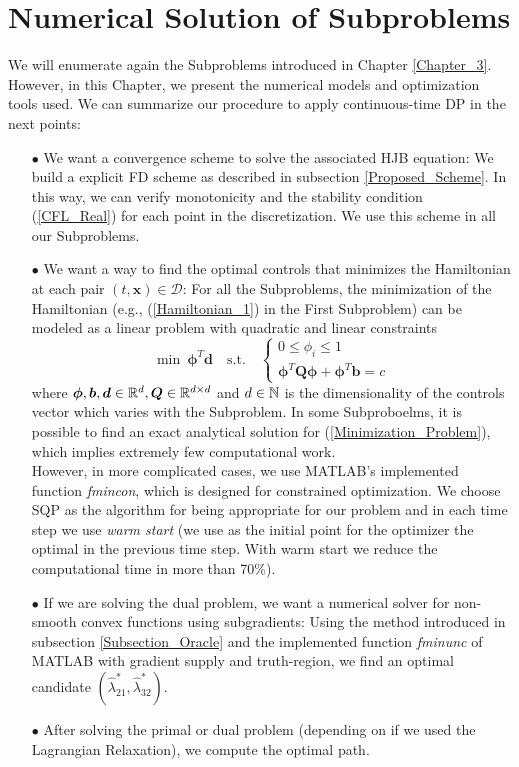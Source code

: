 \section{Numerical Solution of Subproblems}

We will enumerate again the Subproblems introduced in Chapter \ref{Chapter_3}. However, in this Chapter, we present the numerical models and optimization tools used. We can summarize our procedure to apply continuous-time DP in the next points:

\begin{enumerate}

\item[$\bullet$] We want a convergence scheme to solve the associated HJB equation: We build a explicit FD scheme as described in subsection \ref{Proposed_Scheme}. In this way, we can verify monotonicity and the stability condition (\ref{CFL_Real}) for each point in the discretization. We use this scheme in all our Subproblems.

\item[$\bullet$] We want a way to find the optimal controls that minimizes the Hamiltonian at each pair $(t,\bm{x})\in\mathcal{D}$: For all the Subproblems, the minimization of the Hamiltonian (e.g., (\ref{Hamiltonian_1}) in the First Subproblem) can be modeled as a linear problem with quadratic and linear constraints
\begin{equation}
\min\ \bm{\phi}^T\bm{d}\quad\text{s.t.}\quad\begin{cases}
0\leq\phi_i\leq1\\
\bm{\phi}^T\bm{Q}\bm{\phi}+\bm{\phi}^T\bm{b}=c
\end{cases}
\label{Minimization_Problem}
\end{equation}
where $\bm{\phi},\bm{b},\bm{d}\in\mathbb{R}^d,\bm{Q}\in\mathbb{R}^{d\times d}$ and $d\in\mathbb{N}$ is the dimensionality of the controls vector which varies with the Subproblem. In some Subproboelms, it is possible to find an exact analytical solution for (\ref{Minimization_Problem}), which implies extremely few computational work.\\
However, in more complicated cases, we use MATLAB's implemented function \textit{fmincon}, which is designed for constrained optimization. We choose SQP as the algorithm for being appropriate for our problem and in each time step we use \textit{warm start} (we use as the initial point for the optimizer the optimal in the previous time step. With warm start we reduce the computational time in more than 70\%).

\item[$\bullet$] If we are solving the dual problem, we want a numerical solver for non-smooth convex functions using subgradients: Using the method introduced in subsection \ref{Subsection_Oracle} and the implemented function \textit{fminunc} of MATLAB with gradient supply and truth-region, we find an optimal candidate $(\hat{\lambda}_{21}^*,\hat{\lambda}_{32}^*)$.

\item[$\bullet$] After solving the primal or dual problem (depending on if we used the Lagrangian Relaxation), we compute the optimal path.

\end{enumerate}

